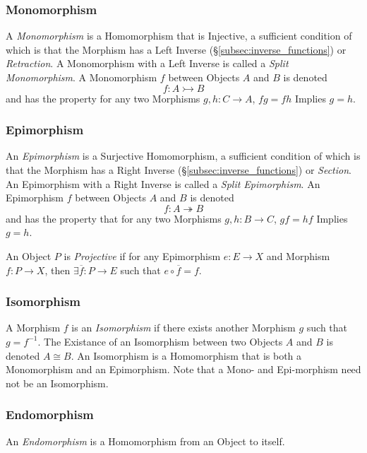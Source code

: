 \documentclass{article}
\begin{document}
\subsubsection{Monomorphism}

A \emph{Monomorphism} is a Homomorphism that is Injective, a
sufficient condition of which is that the Morphism has a Left Inverse
(\S\ref{subsec:inverse_functions}) or \emph{Retraction}. A
Monomorphism with a Left Inverse is called a \emph{Split
  Monomorphism}. A Monomorphism $f$ between Objects $A$ and $B$ is
denoted
\[
    f : A \rightarrowtail B
\]
and has the property for any two Morphisms $g, h : C \rightarrow A$,
$fg = fh$ Implies $g = h$.

\subsubsection{Epimorphism}

An \emph{Epimorphism} is a Surjective Homomorphism, a sufficient
condition of which is that the Morphism has a Right Inverse
(\S\ref{subsec:inverse_functions}) or \emph{Section}. An Epimorphism
with a Right Inverse is called a \emph{Split Epimorphism}. An
Epimorphism $f$ between Objects $A$ and $B$ is denoted
\[
    f : A \twoheadrightarrow B
\]
and has the property that for any two Morphisms $g, h : B \rightarrow
C$, $gf = hf$ Implies $g = h$.

An Object $P$ is \emph{Projective} if for any Epimorphism $e : E
\rightarrow X$ and Morphism $f : P \rightarrow X$, then $\exists
\overline{f} : P \rightarrow E$ such that $e \circ \overline{f} = f$.

\subsubsection{Isomorphism}\label{subsec:isomorphism}

A Morphism $f$ is an \emph{Isomorphism} if there exists another
Morphism $g$ such that $g = f^{-1}$. The Existance of an Isomorphism
between two Objects $A$ and $B$ is denoted $A \cong B$. An Isomorphism
is a Homomorphism that is both a Monomorphism and an Epimorphism. Note
that a Mono- and Epi-morphism need not be an Isomorphism.

\subsubsection{Endomorphism}

An \emph{Endomorphism} is a Homomorphism from an Object to itself.
\end{document}
